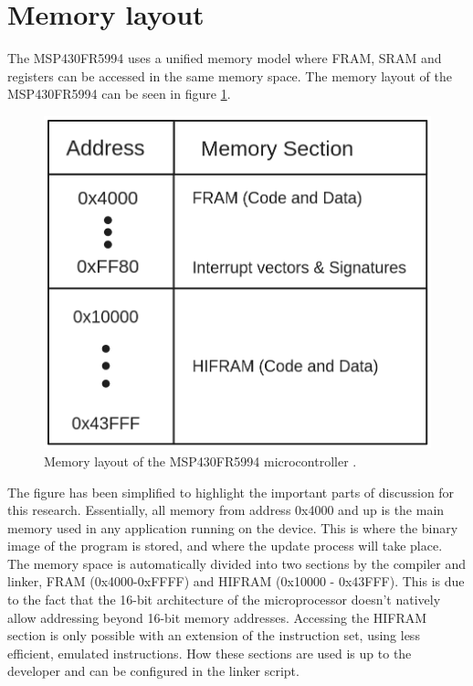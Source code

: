 \section{Memory layout}\label{sec:memory_layout}
The MSP430FR5994 uses a unified memory model where FRAM, SRAM and registers can be accessed in the same memory space. The memory layout of the MSP430FR5994 can be seen in figure \ref{fig:memory_layout}.
\begin{figure}[!ht]
    \begin{shaded}
    \centering
    \includegraphics[width=\figurewidth]{img/mem_layout.png}
    \caption{Memory layout of the MSP430FR5994 microcontroller \cite{fr5994DataSheet}.}
    \label{fig:memory_layout}
\end{shaded}
\end{figure}

The figure has been simplified to highlight the important parts of discussion for this research. Essentially, all memory from address 0x4000 and up is the main memory used in any application running on the device. This is where the binary image of the program is stored, and where the update process will take place. The memory space is automatically divided into two sections by the compiler and linker, FRAM (0x4000-0xFFFF) and HIFRAM (0x10000 - 0x43FFF). This is due to the fact that the 16-bit architecture of the microprocessor doesn't natively allow addressing beyond 16-bit memory addresses. Accessing the HIFRAM section is only possible with an extension of the instruction set, using less efficient, emulated instructions. How these sections are used is up to the developer and can be configured in the linker script. 

